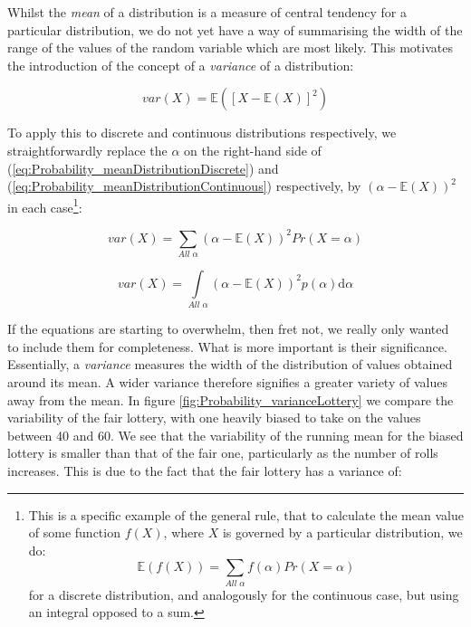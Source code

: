 \documentclass[11pt,fullpage]{book}
\begin{document}
Whilst the \textit{mean} of a distribution is a measure of central tendency for a particular distribution, we do not yet have a way of summarising the width of the range of the values of the random variable which are most likely. This motivates the introduction of the concept of a \textit{variance} of a distribution:

\begin{equation}\label{eq:Probability_varianceDistributionExpectations}
var(X) = \mathbb{E}\left(\left[X-\mathbb{E}(X)\right]^2\right)
\end{equation}

To apply this to discrete and continuous distributions respectively, we straightforwardly replace the $\alpha$ on the right-hand side of (\ref{eq:Probability_meanDistributionDiscrete}) and (\ref{eq:Probability_meanDistributionContinuous}) respectively, by $(\alpha-\mathbb{E}(X))^2$ in each case\footnote{This is a specific example of the general rule, that to calculate the mean value of some function $f(X)$, where $X$ is governed by a particular distribution, we do: \begin{equation}
\mathbb{E}(f(X)) = \sum\limits_{All\; \alpha} f(\alpha) Pr(X=\alpha)
\end{equation}
for a discrete distribution, and analogously for the continuous case, but using an integral opposed to a sum.}:

\begin{equation}\label{eq:Probability_varianceDistributionDiscrete}
var(X) = \sum\limits_{All\; \alpha} (\alpha-\mathbb{E}(X))^2 Pr(X=\alpha)
\end{equation}

\begin{equation}\label{eq:Probability_varianceDistributionContinuous}
var(X) = \int\limits_{All\; \alpha} (\alpha-\mathbb{E}(X))^2 p(\alpha)\mathrm{d}\alpha
\end{equation}

If the equations are starting to overwhelm, then fret not, we really only wanted to include them for completeness. What is more important is their significance. Essentially, a \textit{variance} measures the width of the distribution of values obtained around its mean. A wider variance therefore signifies a greater variety of values away from the mean. In figure \ref{fig:Probability_varianceLottery} we compare the variability of the fair lottery, with one heavily biased to take on the values between 40 and 60. We see that the variability of the running mean for the biased lottery is smaller than that of the fair one, particularly as the number of rolls increases. This is due to the fact that the fair lottery has a variance of:
\end{document}
